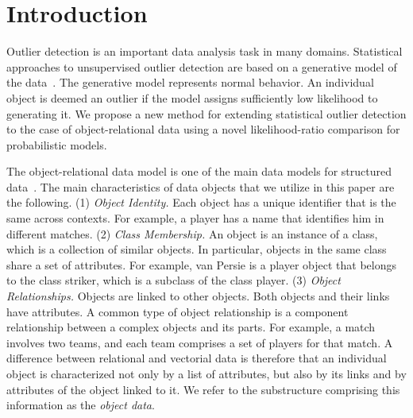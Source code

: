 \documentclass[conference]{IEEEtran}
\begin{document}
\section{Introduction} 
Outlier detection is an important data analysis task in many domains. Statistical approaches to unsupervised outlier detection are based on a generative model of the data~\cite{aggarwal2013}. The generative model represents normal behavior. An individual object is deemed an outlier if  the model assigns sufficiently low likelihood to generating it. 
We propose a new method for extending statistical  outlier detection to the case of object-relational data using a novel likelihood-ratio comparison for probabilistic models. 

The object-relational data model is one of the main data models for structured data~\cite{Koller1997}. The main 
characteristics of data objects that we utilize in this paper are the following. (1) {\em Object Identity.} Each object has a unique identifier that is the same across contexts. For example, a player has a name that identifies him in different matches. (2) {\em Class Membership.} An object is an instance of a class, which is a collection of similar objects. In particular, objects in the same class share a set of attributes. For example, van Persie is a player object that belongs to the class striker, which is a subclass of the  class player. (3) {\em Object Relationships.} Objects are linked  to other objects. Both objects and their links have attributes. A common type of object relationship is a component relationship between a complex objects and its parts.
For example, a match involves two teams, and each team comprises a set of players for that match. A difference between relational and vectorial data is therefore that an individual object is characterized not only by a list of attributes, but also by its links and by attributes of the object linked to it. We refer to the substructure comprising this information as the {\em object data}.
\end{document}
